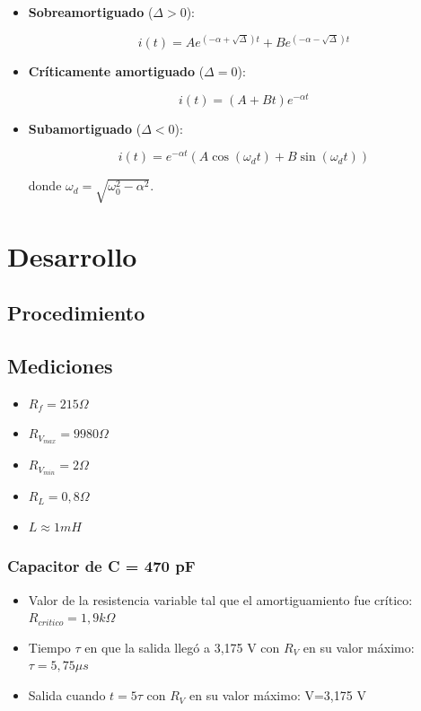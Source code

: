 \documentclass{article}
\begin{document}
\begin{itemize}
  \item \textbf{Sobreamortiguado} (\( \Delta > 0 \)):

  \begin{equation}
  i(t) = A e^{(-\alpha + \sqrt{\Delta})t} + B e^{(-\alpha - \sqrt{\Delta})t}
  \end{equation}

  \item \textbf{Críticamente amortiguado} (\( \Delta = 0 \)):

  \begin{equation}
  i(t) = (A + Bt)e^{-\alpha t}
  \end{equation}

  \item \textbf{Subamortiguado} (\( \Delta < 0 \)):

  \begin{equation}
  i(t) = e^{-\alpha t} \left( A \cos(\omega_d t) + B \sin(\omega_d t) \right)
  \end{equation}

  donde \( \omega_d = \sqrt{\omega_0^2 - \alpha^2} \).
\end{itemize}

\section{Desarrollo}
    \subsection{Procedimiento}
    \subsection{Mediciones}
 
        \begin{itemize}
            \item $ R_f = 215 \Omega $
            \item $ R_{V_{max}} = 9980 \Omega $
            \item $ R_{V_{min}} = 2 \Omega $
            \item $ R_L = 0,8 \Omega $
            \item $ L \approx 1 mH $
        \end{itemize}
        
        \par
        \subsubsection*{Capacitor de C = 470 pF}
            \begin{itemize}
                \item Valor de la resistencia variable tal que el amortiguamiento fue crítico: $ R_{critico} = 1,9 k\Omega $ %
                \item Tiempo $\tau$ en que la salida llegó a 3,175 V con $ R_V $ en su valor máximo: $ \tau = 5,75 \mu s$ %
                \item Salida cuando $t=5\tau$ con $ R_V $ en su valor máximo: V=3,175 V %
            \end{itemize}
\end{document}
